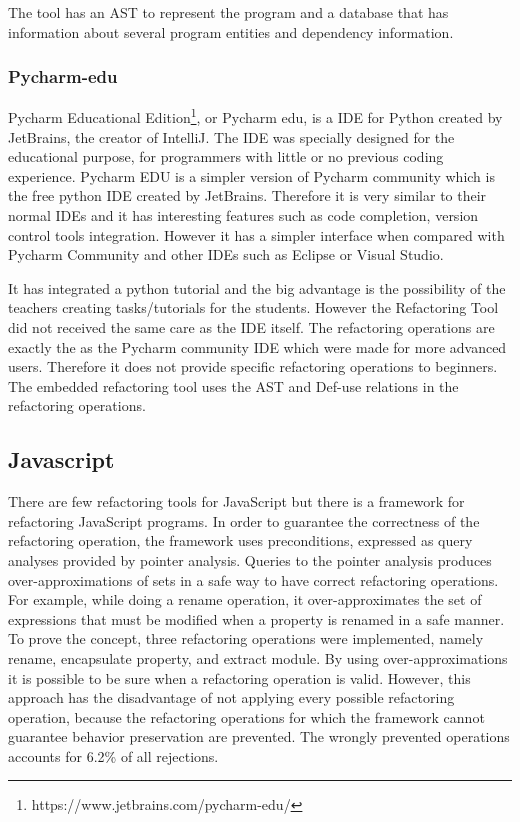 The tool has an AST to represent the program and a database that has information
about several program entities and dependency information.

\subsubsection{Pycharm-edu} %
Pycharm Educational Edition\footnote{https://www.jetbrains.com/pycharm-edu/},
 or Pycharm edu, is a IDE for Python created by JetBrains,
the creator of IntelliJ.
The IDE was specially designed for the educational purpose, for programmers
with little or no previous coding experience.
Pycharm EDU is a simpler version of Pycharm community which is the free
python IDE created by JetBrains.
Therefore it is very similar to their normal IDEs and it has interesting features
such as code completion, version control tools integration.
However it has a simpler interface when compared with
Pycharm Community and other IDEs such as Eclipse or Visual Studio. %

It has integrated a python tutorial and the big advantage is the possibility of
the teachers creating tasks/tutorials for the students.
However the Refactoring Tool did not received the same care as the IDE itself.
The refactoring operations are exactly the as the Pycharm community IDE which were made
for more advanced users.
Therefore it does not provide specific refactoring operations to beginners.
The embedded refactoring tool uses the AST and Def-use relations in the refactoring
operations.
\subsection{Javascript}
There are few refactoring tools for JavaScript but there is a framework
\cite{feldthaus2011tool} for refactoring JavaScript programs. %
In order to guarantee the correctness of the refactoring operation, the framework
uses preconditions, expressed as query analyses provided by pointer analysis. %
Queries to the pointer analysis produces over-approximations of sets in a safe way to
have correct refactoring operations.
For example, while doing a rename operation, it over-approximates the set of expressions
that must be modified when a property is renamed in a safe manner.
To prove the concept, three refactoring operations were implemented, namely rename,
encapsulate property, and extract module.
By using over-approximations it is possible to be sure when a refactoring
operation is valid.
However, this approach has the disadvantage of not applying every possible refactoring operation,
because the refactoring operations for which the framework cannot guarantee behavior
preservation are prevented.
The wrongly prevented operations accounts for 6.2\% of all rejections.

